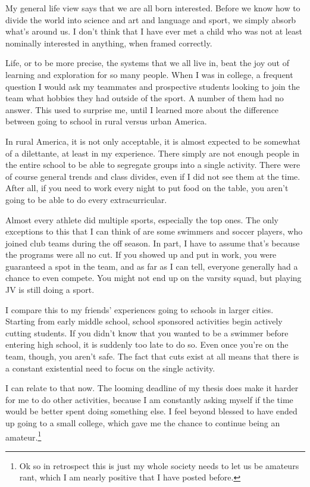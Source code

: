 \documentclass[12pt]{article}[titlepage]
\renewcommand{\,}{\textsuperscript{,}}
\begin{document}
My general life view says that we are all born interested.  
Before we know how to divide the world into science and art and language and sport, we simply absorb what's around us.  
I don't think that I have ever met a child who was not at least nominally interested in anything, when framed correctly.

Life, or to be more precise, the systems that we all live in, beat the joy out of learning and exploration for so many people.  
When I was in college, a frequent question I would ask my teammates and prospective students looking to join the team what hobbies they had outside of the sport.  
A number of them had no answer.  
This used to surprise me, until I learned more about the difference between going to school in rural versus urban America.

In rural America, it is not only acceptable, it is almost expected to be somewhat of a dilettante, at least in my experience.  
There simply are not enough people in the entire school to be able to segregate groups into a single activity.  
There were of course general trends and class divides, even if I did not see them at the time.  
After all, if you need to work every night to put food on the table, you aren't going to be able to do every extracurricular.

Almost every athlete did multiple sports, especially the top ones.  
The only exceptions to this that I can think of are some swimmers and soccer players, who joined club teams during the off season.  
In part, I have to assume that's because the programs were all no cut.  
If you showed up and put in work, you were guaranteed a spot in the team, and as far as I can tell, everyone generally had a chance to even compete.  
You might not end up on the varsity squad, but playing JV is still doing a sport.

I compare this to my friends' experiences going to schools in larger cities.  
Starting from early middle school, school sponsored activities begin actively cutting students.  
If you didn't know that you wanted to be a swimmer before entering high school, it is suddenly too late to do so.  
Even once you're on the team, though, you aren't safe.  
The fact that cuts exist at all means that there is a constant existential need to focus on the single activity.

I can relate to that now.  
The looming deadline of my thesis does make it harder for me to do other activities, because I am constantly asking myself if the time would be better spent doing something else.  
I feel beyond blessed to have ended up going to a small college, which gave me the chance to continue being an amateur.\footnote{Ok so in retrospect this is just my whole society needs to let us be amateurs rant, which I am nearly positive that I have posted before.}
\end{document}
